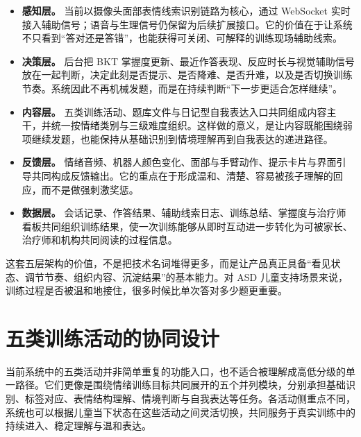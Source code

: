 \FiveLayerArchitectureFigure

\begin{itemize}
  \item \textbf{感知层。} 当前以摄像头面部表情线索识别链路为核心，通过 WebSocket 实时接入辅助信号；语音与生理信号仍保留为后续扩展接口。它的价值在于让系统不只看到“答对还是答错”，也能获得可关闭、可解释的训练现场辅助线索。
  \item \textbf{决策层。} 后台把 BKT 掌握度更新、最近作答表现、反应时长与视觉辅助信号放在一起判断，决定此刻是否提示、是否降难、是否升难，以及是否切换训练节奏。系统因此不再机械发题，而是在持续判断“下一步更适合怎样继续”。
  \item \textbf{内容层。} 五类训练活动、题库文件与日记型自我表达入口共同组成内容主干，并统一按情绪类别与三级难度组织。这样做的意义，是让内容既能围绕弱项继续发题，也能保持从基础识别到情境理解再到自我表达的递进路径。
  \item \textbf{反馈层。} 情绪音频、机器人颜色变化、面部与手臂动作、提示卡片与界面引导共同构成反馈输出。它的重点在于形成温和、清楚、容易被孩子理解的回应，而不是做强刺激奖惩。
  \item \textbf{数据层。} 会话记录、作答结果、辅助线索日志、训练总结、掌握度与治疗师看板共同组织训练结果，使一次训练能够从即时互动进一步转化为可被家长、治疗师和机构共同阅读的过程信息。
\end{itemize}

这套五层架构的价值，不是把技术名词堆得更多，而是让产品真正具备“看见状态、调节节奏、组织内容、沉淀结果”的基本能力。对 ASD 儿童支持场景来说，训练过程是否被温和地接住，很多时候比单次答对多少题更重要。

\section{五类训练活动的协同设计}
当前系统中的五类活动并非简单重复的功能入口，也不适合被理解成高低分级的单一路径。它们更像是围绕情绪训练目标共同展开的五个并列模块，分别承担基础识别、标签对应、表情结构理解、情境判断与自我表达等任务。各活动侧重点不同，系统也可以根据儿童当下状态在这些活动之间灵活切换，共同服务于真实训练中的持续进入、稳定理解与温和表达。

